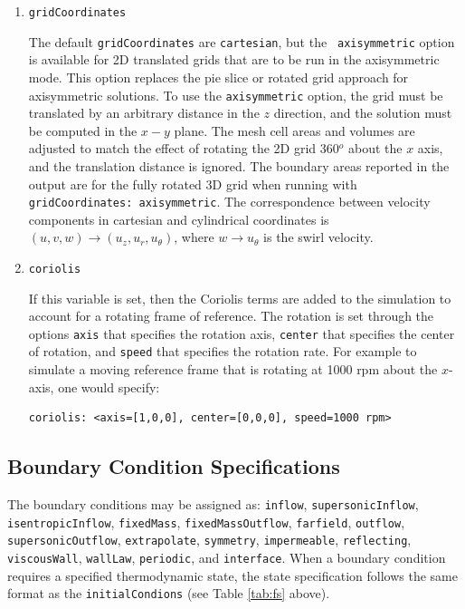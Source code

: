 \documentclass{article}
\begin{document}
\begin{enumerate}
\item {\tt gridCoordinates}

  The default {\tt gridCoordinates} are {\tt cartesian}, but the {\tt
    axisymmetric} option is available for 2D translated grids that are
  to be run in the axisymmetric mode.  This option replaces the pie
  slice or rotated grid approach for axisymmetric solutions.  To use
  the {\tt axisymmetric} option, the grid must be translated by an
  arbitrary distance in the $z$ direction, and the solution must be
  computed in the $x-y$ plane.  The mesh cell areas and volumes are
  adjusted to match the effect of rotating the 2D grid 360$^o$ about
  the $x$ axis, and the translation distance is ignored.  The boundary
  areas reported in the output are for the fully rotated 3D grid when
  running with {\tt gridCoordinates: axisymmetric}.  The
  correspondence between velocity components in cartesian and
  cylindrical coordinates is $(u, v, w) \rightarrow (u_z, u_r,
  u_{\theta})$, where $w \rightarrow u_{\theta}$ is the swirl
  velocity.


\item {\tt coriolis }

  If this variable is set, then the Coriolis terms are added to the
  simulation to account for a rotating frame of reference.  The
  rotation is set through the options {\tt axis} that specifies the
  rotation axis, {\tt center} that specifies the center of rotation,
  and {\tt speed} that specifies the rotation rate.  For example
  to simulate a moving reference frame that is rotating at 1000 rpm
  about the $x$-axis, one would specify:
\begin{verbatim}
coriolis: <axis=[1,0,0], center=[0,0,0], speed=1000 rpm>
\end{verbatim}
\end{enumerate}

\subsection{Boundary Condition Specifications}


The boundary conditions may be assigned as:
  {\tt inflow}, {\tt supersonicInflow},
  {\tt isentropicInflow}, {\tt fixedMass}, {\tt fixedMassOutflow},
  {\tt farfield}, {\tt outflow}, {\tt supersonicOutflow},
  {\tt extrapolate}, {\tt symmetry}, {\tt impermeable},
  {\tt reflecting}, {\tt viscousWall}, {\tt wallLaw}, {\tt periodic},
  and {\tt interface}.  When a boundary condition requires a specified thermodynamic
  state, the state specification follows the same format as the {\tt initialCondions}
  (see Table \ref{tab:fs} above).\\
  
\end{document}
